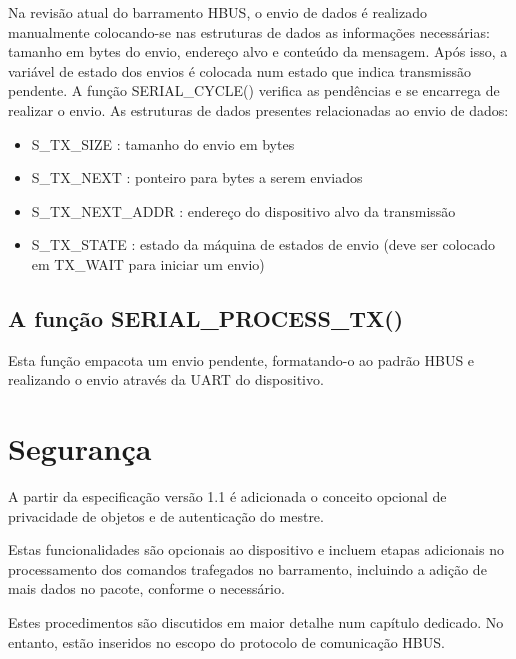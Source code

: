 Na revisão atual do barramento HBUS, o envio de dados é realizado manualmente colocando-se nas estruturas de dados as informações necessárias: tamanho em bytes do envio, endereço alvo e conteúdo da mensagem. Após isso, a variável de estado dos envios é colocada num estado que indica transmissão pendente. A função SERIAL\_CYCLE() verifica as pendências e se encarrega de realizar o envio. As estruturas de dados presentes relacionadas ao envio de dados:

\begin{itemize}

\item S\_TX\_SIZE : tamanho do envio em bytes
\item S\_TX\_NEXT : ponteiro para bytes a serem enviados
\item S\_TX\_NEXT\_ADDR : endereço do dispositivo alvo da transmissão
\item S\_TX\_STATE : estado da máquina de estados de envio (deve ser colocado em TX\_WAIT para iniciar um envio)

\end{itemize}

\subsection{A função SERIAL\_PROCESS\_TX()}

Esta função empacota um envio pendente, formatando-o ao padrão HBUS e realizando o envio através da UART do dispositivo.

\section{Segurança}

A partir da especificação versão 1.1 é adicionada o conceito opcional de privacidade de objetos e de autenticação do mestre.

Estas funcionalidades são opcionais ao dispositivo e incluem etapas adicionais no processamento dos comandos trafegados no barramento, incluindo a adição de mais dados no pacote, conforme o necessário.

Estes procedimentos são discutidos em maior detalhe num capítulo dedicado. No entanto, estão inseridos no escopo do protocolo de comunicação HBUS.
